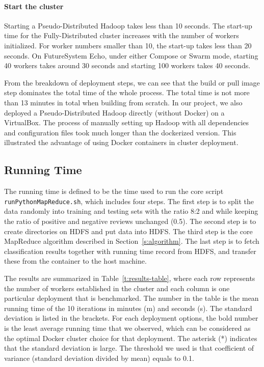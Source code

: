 \paragraph{Start the cluster}
	Starting a Pseudo-Distributed Hadoop takes less than 10
	seconds. The start-up time for the Fully-Distributed cluster
	increases with the number of workers initialized. For worker
	numbers smaller than 10, the start-up takes less than 20
	seconds. On FutureSystem Echo, under either Compose or Swarm
	mode, starting 40 workers takes around 30 seconds and starting
	100 workers takes 40 seconds.


From the breakdown of deployment steps, we can see that the build or pull
image step dominates the total time of the whole process. The total
time is not more than 13 minutes in total when building from
scratch. In our project, we also deployed a Pseudo-Distributed Hadoop
directly (without Docker) on a VirtualBox. The process of manually
setting up Hadoop with all dependencies and configuration files took
much longer than the dockerized version. This illustrated the
advantage of using Docker containers in cluster deployment.

\subsection{Running Time}

The running time is defined to be the time used to run the core script 
\verb|runPythonMapReduce.sh|, which includes four steps. The first step is 
to split the data randomly into training and testing sets with the
ratio 8:2 and while keeping the ratio of positive and negative reviews
unchanged (0.5). The second step is to create directories on HDFS and
put data into HDFS. The third step is the core MapReduce algorithm
described in Section~\ref{s:algorithm}. The last step is to fetch
classification results together with running time record from HDFS,
and transfer these from the container to the host machine.

The results are summarized in Table~\ref{t:results-table}, where each
row represents the number of workers established in the cluster and
each column is one particular deployment that is benchmarked. The
number in the table is the mean running time of the 10 iterations in
minutes (m) and seconds (s).  The standard deviation is listed in the
brackets. For each deployment options, the bold number is the least
average running time that we observed, which can be considered as the
optimal Docker cluster choice for that deployment. The asterisk (*) indicates 
that the standard deviation is large. The
threshold we used is that coefficient of variance (standard deviation
divided by mean) equals to 0.1.


